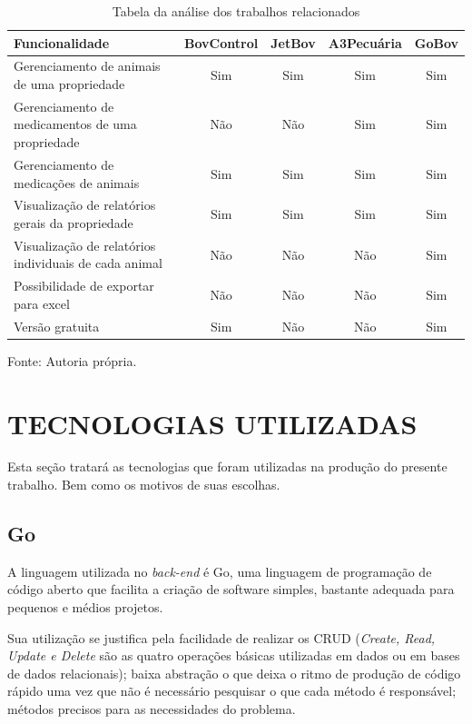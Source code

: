 \begin{table}[H]
	\begin{center}
		\caption{Tabela da análise dos trabalhos relacionados}
		\begin{tabular}{ | p{8cm} |  c | c | c | c |}
			\hline
			Funcionalidade & BovControl & JetBov & A3Pecuária & GoBov \\ \hline
			Gerenciamento de animais de uma propriedade & Sim & Sim & Sim & Sim \\  \hline
			Gerenciamento de medicamentos de uma propriedade & Não & Não & Sim & Sim  \\ \hline
			Gerenciamento de medicações de animais & Sim & Sim & Sim & Sim  \\ \hline
			Visualização de relatórios gerais da propriedade & Sim & Sim & Sim & Sim  \\ \hline
			Visualização de relatórios individuais de cada animal & Não & Não & Não & Sim  \\ \hline
			Possibilidade de exportar para excel & Não & Não & Não & Sim  \\ \hline
			Versão gratuita & Sim & Não & Não & Sim  \\
			\hline
		\end{tabular}
		Fonte: Autoria própria.
	\end{center}
\end{table}


\section{TECNOLOGIAS UTILIZADAS}

Esta seção tratará as tecnologias que foram utilizadas na produção do presente trabalho. Bem como os motivos de suas escolhas.

\subsection{\textbf{Go}}

A linguagem utilizada no \textit{back-end} é Go, uma linguagem de programação de código aberto que facilita a criação de software simples, bastante adequada para pequenos e médios projetos.

Sua utilização se justifica pela facilidade de realizar os CRUD (\textit{Create, Read, Update e Delete} são as quatro operações básicas utilizadas em dados ou em bases de dados relacionais); baixa abstração o que deixa o ritmo de produção de código rápido uma vez que não é necessário pesquisar o que cada método é responsável; métodos precisos para as necessidades do problema.

